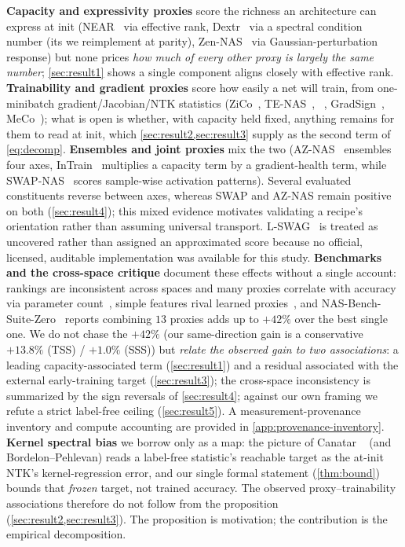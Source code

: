 \noindent\textbf{Capacity and expressivity proxies} score the richness an
architecture can express at init (NEAR~\cite{near2025} via effective rank,
Dextr~\cite{dextr2025} via a spectral condition number (its  we
reimplement at parity), Zen-NAS~\cite{lin2021zen} via Gaussian-perturbation
response) but none prices \emph{how much of every other proxy is largely the same
number}; \cref{sec:result1} shows a single component aligns closely with
effective rank.
\noindent\textbf{Trainability and gradient proxies} score how easily a net will
train, from one-minibatch gradient/Jacobian/NTK statistics
(ZiCo~\cite{li2023zico}, TE-NAS~\cite{chen2021tenas},
~\cite{jacobcov}, GradSign~\cite{gradsign},
MeCo~\cite{jiang2023meco}); what is open is whether, with capacity held fixed,
anything remains for them to read at init, which \cref{sec:result2,sec:result3}
supply as the second term of \cref{eq:decomp}.
\noindent\textbf{Ensembles and joint proxies} mix the two (AZ-NAS~\cite{aznas2024}
ensembles four axes, InTrain~\cite{intrain2026} multiplies a capacity term by a
gradient-health term, while SWAP-NAS~\cite{peng2024swap} scores sample-wise
activation patterns). Several evaluated constituents reverse between axes,
whereas SWAP and AZ-NAS remain positive on both
(\cref{sec:result4}); this mixed evidence motivates validating a recipe's
orientation rather than assuming universal transport.
L-SWAG~\cite{casarin2025lswag} is treated as uncovered rather than assigned an
approximated score because no official, licensed, auditable implementation was
available for this study.
\noindent\textbf{Benchmarks and the cross-space critique} document these effects
without a single account: rankings are inconsistent across spaces and many proxies
correlate with accuracy via parameter count~\cite{ning2021evaluating,white2021powerful},
simple features rival learned proxies~\cite{kadlecova2024graf}, and
NAS-Bench-Suite-Zero~\cite{krishnakumar2022nbsz} reports combining $13$ proxies adds
up to $+42\%$ over the best single one. We do not chase the $+42\%$ (our
same-direction gain is a conservative $+13.8\%$ (TSS) / $+1.0\%$ (SSS)) but
\emph{relate the observed gain to two associations}: a leading
capacity-associated term (\cref{sec:result1}) and a residual associated with the
external early-training target (\cref{sec:result3}); the cross-space
inconsistency is summarized by the sign reversals of
\cref{sec:result4}; against our own framing we refute a strict label-free ceiling
(\cref{sec:result5}). A measurement-provenance inventory and compute accounting
are provided in \cref{app:provenance-inventory}.
\noindent\textbf{Kernel spectral bias} we borrow only as a map: the picture of
Canatar \etal~\cite{canatar2021spectral} (and Bordelon--Pehlevan) reads a label-free
statistic's reachable target as the at-init NTK's kernel-regression error, and our
single formal statement (\cref{thm:bound}) bounds that \emph{frozen} target, not
trained accuracy. The observed proxy--trainability associations therefore do not
follow from the proposition (\cref{sec:result2,sec:result3}). The proposition is
motivation; the contribution is the empirical decomposition.
